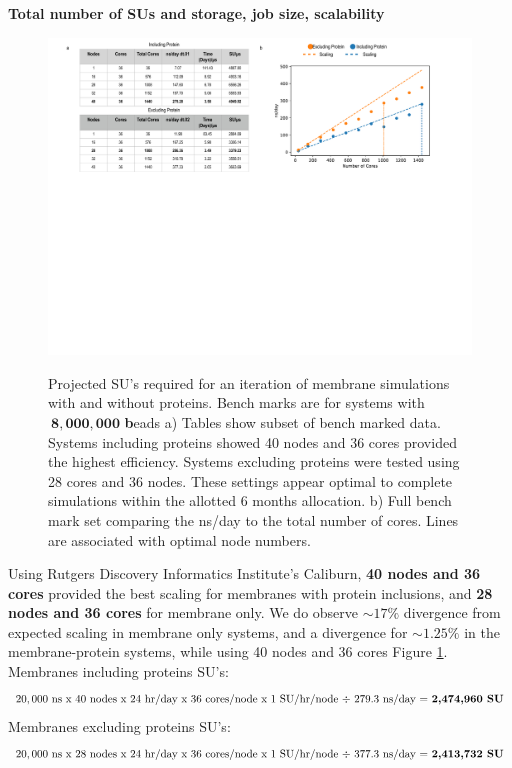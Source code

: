 \documentclass[oneside]{report}
\begin{document}
{\bf Total number of SUs and storage, job size, scalability}
\begin{figure}[h]
\includegraphics [scale=.5]{SU_Bench.pdf}
\label{fig:SU}
\caption{Projected SU's required for an iteration of membrane simulations with and without proteins. Bench marks are for systems with $\pmb{\> 8,000,000}$ \textbf beads a) Tables show subset of bench marked data. Systems including proteins showed 40 nodes and 36 cores provided the highest efficiency. Systems excluding proteins were tested using 28 cores and 36 nodes. These settings appear optimal to complete simulations within the allotted 6 months allocation. b) Full bench mark set comparing the ns/day to the total number of cores. Lines are associated with optimal node numbers.}
\end{figure}

Using Rutgers Discovery Informatics Institute's Caliburn, \textbf{40 nodes and 36 cores} provided the best scaling for membranes with protein inclusions, and \textbf{28 nodes and 36 cores} for membrane only. We do observe $\sim 17\%$ divergence from expected scaling in membrane only systems, and a divergence for $\sim 1.25\%$ in the membrane-protein systems, while using 40 nodes and 36 cores Figure \ref{fig:SU}. \\

Membranes including proteins SU's:
\[20,000\textrm{ ns x }40\textrm{ nodes x }24\textrm{ hr/day x } 36 \textrm{ cores/node x } 1 \textrm{ SU/hr/node $ \div$ }279.3 \textrm{ ns/day = } \textbf{2,474,960 \textrm{SU}} \]
Membranes excluding proteins SU's:
\[ 20,000\textrm{ ns x }28\textrm{ nodes x }24\textrm{ hr/day x } 36 \textrm{ cores/node x } 1 \textrm{ SU/hr/node $ \div$ }377.3\textrm{ ns/day = } \textbf{2,413,732 \textrm{SU}} \]
\end{document}
